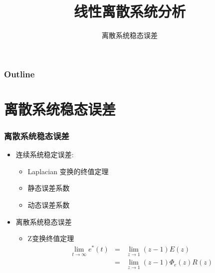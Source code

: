 \documentclass[table]{beamer}
\subtitle{离散系统稳态误差}
\title{线性离散系统分析}
\author{}
\date{}
\begin{document}
\maketitle

\begin{frame}
\frametitle{Outline}
\setcounter{tocdepth}{3}
\tableofcontents
\end{frame}












\section{离散系统稳态误差}
\label{sec-1}
\begin{frame}
\frametitle{离散系统稳态误差}
\label{sec-1-1}

\begin{itemize}
\item 连续系统稳定误差:
\begin{itemize}
\item Laplacian 变换的终值定理
\item 静态误差系数
\item 动态误差系数
\end{itemize}
\item <2->离散系统稳态误差
\begin{itemize}
\item Z变换终值定理
     \begin{eqnarray*}
     \lim_{t\rightarrow\infty}e^*(t) & = &\lim_{z\rightarrow 1}(z-1)E(z)\\
      &=& \lim_{z\rightarrow 1}(z-1)\Phi_e(z)R(z)
     \end{eqnarray*}
\end{itemize}
\end{itemize}
\end{frame}
\end{document}

